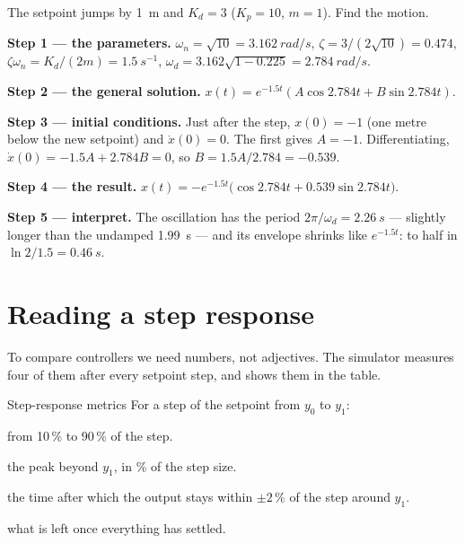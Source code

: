 \begin{example}
\label{ex:damper-under}
The setpoint jumps by \SI{1}{m} and $K_d = 3$ ($K_p = 10$, $m = 1$). Find the motion.

\textbf{Step 1 — the parameters.} $\omega_n = \sqrt{10} = \SI{3.162}{rad/s}$, $\zeta = 3/(2\sqrt{10}) = 0.474$, $\zeta\omega_n = K_d/(2m) = \SI{1.5}{s^{-1}}$, $\omega_d = 3.162\sqrt{1 - 0.225} = \SI{2.784}{rad/s}$.

\textbf{Step 2 — the general solution.} $x(t) = e^{-1.5t}(A\cos 2.784t + B\sin 2.784t)$.

\textbf{Step 3 — initial conditions.} Just after the step, $x(0) = -1$ (one metre below the new setpoint) and $\dot x(0) = 0$. The first gives $A = -1$. Differentiating, $\dot x(0) = -1.5A + 2.784B = 0$, so $B = 1.5A/2.784 = -0.539$.

\textbf{Step 4 — the result.} $x(t) = -e^{-1.5t}\big(\cos 2.784t + 0.539\sin 2.784t\big)$.

\textbf{Step 5 — interpret.} The oscillation has the period $2\pi/\omega_d = \SI{2.26}{s}$ — slightly longer than the undamped \SI{1.99}{s} — and its envelope shrinks like $e^{-1.5t}$: to half in $\ln 2/1.5 = \SI{0.46}{s}$.
\end{example}

\section{Reading a step response}

To compare controllers we need numbers, not adjectives. The simulator measures four of them after every setpoint step, and shows them in the  table.

\begin{definition}{Step-response metrics}
For a step of the setpoint from $y_0$ to $y_1$:
\begin{description}[leftmargin=0pt, itemsep=2pt, font=\sffamily\small\bfseries]
  \item[Rise time $t_r$] from 10\,\% to 90\,\% of the step.
  \item[Overshoot $M_p$] the peak beyond $y_1$, in \% of the step size.
  \item[Settling time $t_s$] the time after which the output stays within $\pm2\,\%$ of the step around $y_1$.
  \item[Steady-state error $e_{ss}$] what is left once everything has settled.
\end{description}
\end{definition}

